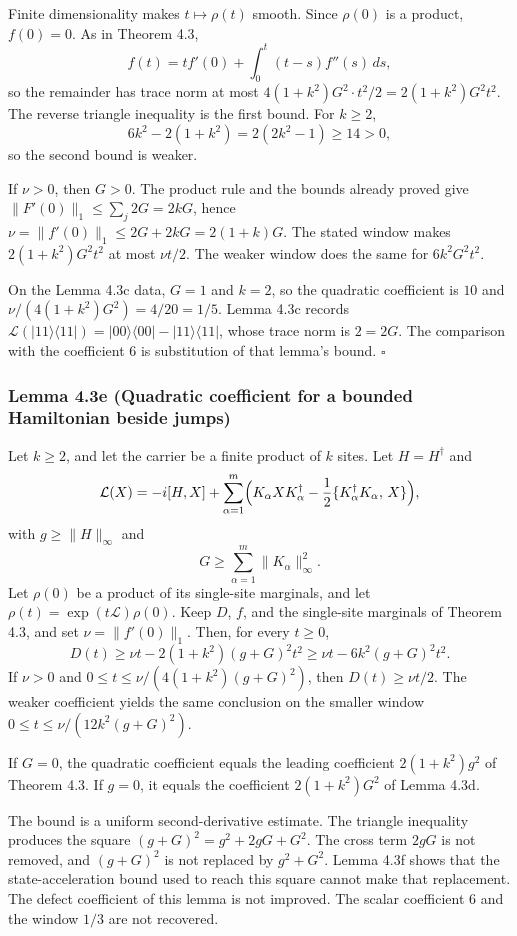\documentclass[
  11pt,
]{article}
\begin{document}
Finite dimensionality makes \(t\mapsto\rho(t)\) smooth. Since
\(\rho(0)\) is a product, \(f(0)=0\). As in Theorem 4.3,
\[
f(t)=tf'(0)+\int_0^t(t-s)f''(s)\,ds,
\]
so the remainder has trace norm at most
\(4(1+k^2)G^2\cdot t^2/2=2(1+k^2)G^2t^2\). The reverse triangle
inequality is the first bound. For \(k\ge 2\),
\[
6k^2-2(1+k^2)=2(2k^2-1)\ge 14>0,
\]
so the second bound is weaker.

If \(\nu>0\), then \(G>0\). The product rule and the bounds already
proved give \(\|F'(0)\|_1\le\sum_j 2G=2kG\), hence
\(\nu=\|f'(0)\|_1\le 2G+2kG=2(1+k)G\). The stated window makes
\(2(1+k^2)G^2t^2\) at most \(\nu t/2\). The weaker window does the same
for \(6k^2G^2t^2\).

On the Lemma 4.3c data, \(G=1\) and \(k=2\), so the quadratic
coefficient is \(10\) and
\(\nu/(4(1+k^2)G^2)=4/20=1/5\). Lemma 4.3c records
\(\mathcal L(|11\rangle\langle11|)
=|00\rangle\langle00|-|11\rangle\langle11|\), whose trace norm is
\(2=2G\). The comparison with the coefficient \(6\) is substitution of
that lemma's bound. \(\square\)

\subsubsection{Lemma 4.3e (Quadratic coefficient for a bounded Hamiltonian beside jumps)}\label{lemma-4.3e-quadratic-coefficient-for-a-bounded-hamiltonian-beside-jumps}

Let \(k\ge 2\), and let the carrier be a finite product of \(k\) sites. Let
\(H=H^\dagger\) and
\[
\mathcal L(X)
=-i[H,X]
+\sum_{\alpha=1}^{m}
\Bigl(
K_\alpha X K_\alpha^\dagger
-\frac12\{K_\alpha^\dagger K_\alpha,\,X\}
\Bigr),
\]
with \(g\ge\|H\|_\infty\) and
\[
G\ge\sum_{\alpha=1}^{m}\|K_\alpha\|_\infty^2.
\]
Let \(\rho(0)\) be a product of its single-site marginals, and let
\(\rho(t)=\exp(t\mathcal L)\rho(0)\). Keep \(D\), \(f\), and the
single-site marginals of Theorem 4.3, and set
\(\nu=\|f'(0)\|_1\). Then, for every \(t\ge 0\),
\[
D(t)
\ge\nu t-2(1+k^2)(g+G)^2t^2
\ge\nu t-6k^2(g+G)^2t^2.
\]
If \(\nu>0\) and \(0\le t\le\nu/(4(1+k^2)(g+G)^2)\), then
\(D(t)\ge\nu t/2\). The weaker coefficient yields the same conclusion
on the smaller window \(0\le t\le\nu/(12k^2(g+G)^2)\).

If \(G=0\), the quadratic coefficient equals the leading coefficient
\(2(1+k^2)g^2\) of Theorem 4.3. If \(g=0\), it equals the coefficient
\(2(1+k^2)G^2\) of Lemma 4.3d.

The bound is a uniform second-derivative estimate. The triangle
inequality produces the square \((g+G)^2=g^2+2gG+G^2\). The cross term
\(2gG\) is not removed, and \((g+G)^2\) is not replaced by \(g^2+G^2\).
Lemma 4.3f shows that the state-acceleration bound used to reach this
square cannot make that replacement. The defect coefficient of this
lemma is not improved. The scalar coefficient \(6\) and the window
\(1/3\) are not recovered.
\end{document}
